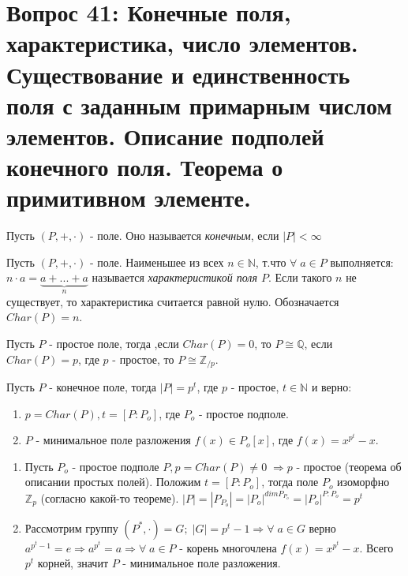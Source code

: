 \section{Вопрос 41: Конечные поля, характеристика, число элементов. Существование и единственность поля с заданным примарным числом элементов. Описание подполей конечного поля. Теорема о примитивном элементе.
}

\begin{defs}
  Пусть $(P,+,\cdot)$ - поле. Оно называется \textit{конечным}, если $|P| < \infty$
\end{defs}

\begin{defs}
  Пусть $(P,+,\cdot)$ - поле. Наименьшее из всех $n \in \mathbb{N}$, т.что $\forall\; a \in P$ выполняется:
  $n \cdot a = \underbrace{a + ... + a}_n$ называется \textit{характеристикой поля $P$}. Если такого $n$ не существует,
  то характеристика считается равной нулю. Обозначается $Char(P) = n$.
\end{defs}

\begin{proofs}
	Пусть $P$ - простое поле, тогда ,если $Char(P) = 0$, то $P \cong \mathbb{Q}$, если $Char(P) = p$, где $p$ - простое, 
  то $P \cong \mathbb{Z}_{/p}$.
\end{proofs}

\begin{proofs}
	Пусть $P$ - конечное поле, тогда $|P| = p^t$, где $p$ - простое, $t \in \mathbb{N} $ и верно:
  \begin{enumerate}
    \item $p = Char(P), t = [P : P_o]$, где $P_o$ - простое подполе.
    \item $P$ - минимальное поле разложения $f(x) \in P_o[x]$, где $f(x) = x^{p^t} - x$.
  \end{enumerate}
  \begin{dokvo}
    \begin{enumerate}
    \item Пусть $P_o$ - простое подполе $P, p = Char(P) \neq 0\; \Rightarrow p$ - простое (теорема об описании простых полей). Положим $t = [P:P_o]$,
    тогда поле $P_o$ изоморфно $\mathbb{Z}_p$ (согласно какой-то теореме). $|P| = |P_{P_o}| = |P_o|^{dimP_{P_o}} = |P_o|^{P:P_o} = p^t$
    \item Рассмотрим группу $(P^*, \cdot) = G;\; |G| = p^t - 1 \Rightarrow \forall\; a \in G$ верно $a^{p^t - 1} = e \Rightarrow a^{p^t} = a
    \Rightarrow \forall\; a \in P$ - корень многочлена $f(x) = x^{p^t} - x$. Всего $p^t$ корней, значит $P$ - минимальное поле разложения. 
  \end{enumerate}
	\end{dokvo}
\end{proofs}

